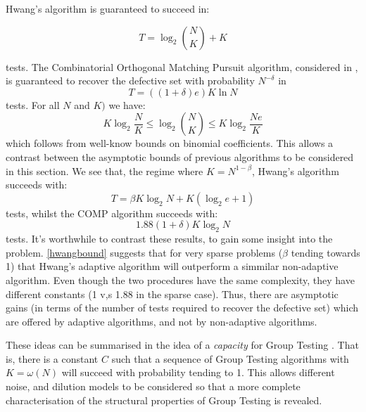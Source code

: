 Hwang's algorithm is guaranteed to succeed in:

\begin{equation}
T = \log_2{N\choose K} + K
\end{equation}

tests. The Combinatorial Orthogonal Matching Pursuit algorithm, considered in \cite{Chan2011}, is guaranteed to recover the defective set with probability \(N^{-\delta} \) in
%
\begin{equation}
T = \left(\left(1+\delta\right)e\right)K\ln{N}
\end{equation}
%
tests. For all \(N\) and \(K)\) we have:
%
\begin{equation}
K\log_2{\frac{N}{K}} \leq \log_2{N \choose K} \leq K \log_2{\frac{Ne}{K}}
\end{equation}
%
which follows from well-know bounds on binomial coefficients. This allows a contrast between the asymptotic bounds of previous algorithms to be considered in this section. We see that, the regime where \(K = N^{1-\beta}\), Hwang's algorithm succeeds with:
%
\begin{equation}
T = \beta K \log_2{N} + K\left(\log_2{e} + 1\right)
\end{equation}
\label{hwangbound}
%
tests, whilst the COMP algorithm succeeds with:
%
\begin{equation}
1.88\left(1+\delta\right)K\log_2{N}
\end{equation}
\label{compbound}
%
tests. It's worthwhile to contrast these results, to gain some insight into the problem. \ref{hwangbound} suggests that for very sparse problems (\(\beta\) tending towards 1) that Hwang's adaptive algorithm will outperform a simmilar non-adaptive algorithm. Even though the two procedures have the same complexity, they have different constants (1 v,s 1.88 in the sparse case). Thus, there are asymptotic gains (in terms of the number of tests required to recover the defective set) which are offered by adaptive algorithms, and not by non-adaptive algorithms.

These ideas can be summarised in the idea of a \textit{capacity} for Group Testing \cite{Baldassini2013}. That is, there is a constant \(C\) such that a sequence of Group Testing algorithms with \( K = \omega\left(N\right)\) will succeed with probability tending to 1. This allows different noise, and dilution models to be considered so that a more complete characterisation of the structural properties of Group Testing is revealed.
 
